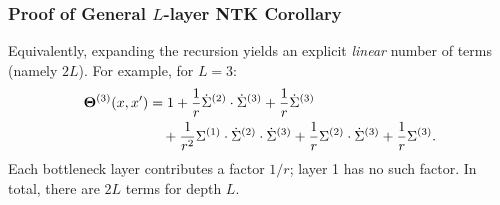 \subsubsection{Proof of General \texorpdfstring{\(L\)}{L}-layer NTK Corollary}
\label{appendix:proof-general-L}

\begin{remark}\label{appendix:remark-2L-expansion}
Equivalently, expanding the recursion yields an explicit \emph{linear} number of terms (namely \(2L\)). For example, for \( L=3 \):
\begin{align}
\boldsymbol{\Theta}^{(3)}(x,x') &= 1 + \frac{1}{r}\dot{\Sigma}^{(2)}\cdot\dot{\Sigma}^{(3)} + \frac{1}{r}\dot{\Sigma}^{(3)} \nonumber\\
&\quad + \frac{1}{r^2}\Sigma^{(1)}\cdot\dot{\Sigma}^{(2)}\cdot\dot{\Sigma}^{(3)} + \frac{1}{r}\Sigma^{(2)}\cdot\dot{\Sigma}^{(3)} + \frac{1}{r}\Sigma^{(3)}.
\end{align}
Each bottleneck layer contributes a factor \( 1/r \); layer 1 has no such factor. In total, there are \( 2L \) terms for depth \( L \).
\end{remark}

